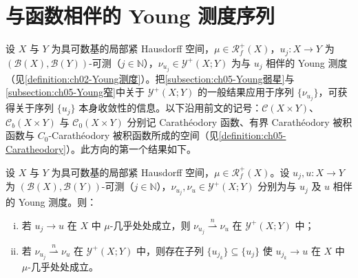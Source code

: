 \documentclass[../../main.tex]{subfiles}%
\begin{document}
\section{与函数相伴的 Young 测度序列}\label{section:ch05-收敛}

设 $X$ 与 $Y$ 为具可数基的局部紧 Hausdorff 空间，$\mu\in\mathscr{R}^+_f(X)$，$u_j:X\to Y$ 为 $(\mathscr{B}(X),\mathscr{B}(Y))$-可测（$j\in\mathbb{N}$），$\nu_{u_j}\in\mathcal{Y}^+(X;Y)$ 为与 $u_j$ 相伴的 Young 测度（见\cref{definition:ch02-Young测度}）。把\cref{subsection:ch05-Young弱星}与\cref{subsection:ch05-Young窄}中关于 $\mathcal{Y}^+(X;Y)$ 的一般结果应用于序列 $\{\nu_{u_j}\}$，可获得关于序列 $\{u_j\}$ 本身收敛性的信息。以下沿用前文的记号：$\mathcal{C}(X\times Y)$、$\mathcal{C}_b(X\times Y)$ 与 $\mathcal{C}_0(X\times Y)$ 分别记 Carathéodory 函数、有界 Carathéodory 被积函数与 $C_0$-Carathéodory 被积函数所成的空间（见\cref{definition:ch05-Caratheodory}）。此方向的第一个结果如下。

\begin{proposition}\label{proposition:ch05-几乎处处收敛}\label{proposition:ch05-5.4.1}
设 $X$ 与 $Y$ 为具可数基的局部紧 Hausdorff 空间，$\mu\in\mathscr{R}^+_f(X)$。设 $u_j,u:X\to Y$ 为 $(\mathscr{B}(X),\mathscr{B}(Y))$-可测（$j\in\mathbb{N}$），$\nu_{u_j},\nu_u\in\mathcal{Y}^+(X;Y)$ 分别为与 $u_j$ 及 $u$ 相伴的 Young 测度。则：
\begin{enumerate}[(i)]
\item\label{item:ch05-ae-i} 若 $u_j\to u$ 在 $X$ 中 $\mu$-几乎处处成立，则 $\nu_{u_j}\stackrel{n}{\rightharpoonup}\nu_u$ 在 $\mathcal{Y}^+(X;Y)$ 中；
\item\label{item:ch05-ae-ii} 若 $\nu_{u_j}\stackrel{n}{\rightharpoonup}\nu_u$ 在 $\mathcal{Y}^+(X;Y)$ 中，则存在子列 $\{u_{j_k}\}\subseteq\{u_j\}$ 使 $u_{j_k}\to u$ 在 $X$ 中 $\mu$-几乎处处成立。
\end{enumerate}
\end{proposition}
\end{document}
